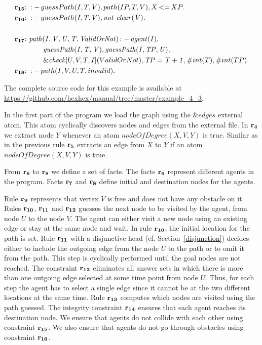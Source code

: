 \documentclass[a4paper, titlepage]{article}
\newcommand{\ext}[3]{\ensuremath{\&{\mathit{#1}}[#2](#3)}}
\DeclareMathOperator{\leftimpl}{:-}
\DeclareMathOperator{\nott}{\mathit{not}}
\DeclareMathOperator{\lesseq}{<=}
\newcommand{\examplelink}[1]{\url{https://github.com/hexhex/manual/tree/master/#1}}
\newcommand{\row}[1]{%
  \ensuremath{\color{black}\ensuremath{\mathbf{#1}} \color{black}}%
}
\newcommand{\rowprefix}[1]{%
  \ensuremath{\color{black}\mathbf{#1{:}}\ }%
}
\begin{document}
\begin{exmp}
\begin{align*}
\rowprefix{r_{15}} &  \leftimpl guessPath(I, T, V), 
path(IP,T,V), X \lesseq XP. \\
\rowprefix{r_{16}} &  \leftimpl guessPath(I,T,V), \nott \thinspace  
\mathit{clear(V).}\\
\\
\rowprefix{r_{17}} &  \mathit{path(I,V,U,T,ValidOrNot)} 
\leftimpl \mathit{agent(I)}, \\ & \qquad \mathit{guessPath(I, T, 
V)}, \mathit{guessPath(I, TP, U)}, \\ & \qquad \ext{check}{U, 
V, T, I}{ValidOrNot}, \mathit{TP=T+1}, \#int(T), 
\#int(TP).  \\
\rowprefix{r_{18}} & \leftimpl path(I, V, U, T, invalid). 
\end{align*}
\end{exmp}
The complete source code for this example is available at \examplelink{example_4_3}.

In the first part of the program we load the graph using 
the $\&edges$ external atom. This atom cyclically discovers 
nodes and edges from the external file. In $\row{r_4}$ we 
extract node $Y$ whenever an atom $\mathit{nodeOfDegree(X, 
V, Y)}$ is true. Similar as in the previous rule $\row{r_5}$ extracts an edge from $X$ to $Y$ if an atom 
$\mathit{nodeOfDegree(X, V,Y)}$ is true. 

From $\row{r_6}$ to $\row{r_8}$ we define a set of facts. 
The facts $\row{r_6}$ represent different agents in the program. 
Facts $\row{r_7}$ and $\row{r_8}$ define initial and 
destination nodes for the agents.  

Rule $\row{r_9}$ 
represents that vertex $V$ is free and does not have any 
obstacle on it. Rules $\row{r_{10}}$, $\row{r_{11}}$ and 
$\row{r_{12}}$ guesses the next node to be visited by the agent, from 
node $U$ to the node $V$. The agent can either visit a new node 
using an existing edge or stay at the same node and wait. 
In rule $\row{r_{10}}$, the initial location for the path is set. Rule $\row{r_{11}}$ 
with a disjunctive head (cf. Section~\ref{disjunction}) decides either to include the outgoing edge 
from the node $U$ to the path or to omit it from the path. 
This step is cyclically performed until the goal nodes are not 
reached. The constraint $\row{r_{12}}$ eliminates all answer sets in which there is more than one outgoing edge 
selected at some time point from node $U$. Thus, for each step 
the agent has to select a single edge since it cannot be at the 
two different locations at the same time. Rule $\row{\row{r_{13}}}$ computes which nodes are visited using the path 
guessed. The integrity constraint $\row{r_{14}}$ ensures that 
each agent reaches its destination node. We ensure that 
agents do not collide with each other using constraint 
$\row{r_{15}}$. We also ensure that agents do not go through 
obstacles using constraint $\row{r_{16}}$. 
\end{document}

